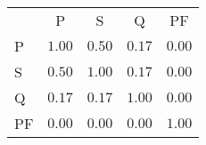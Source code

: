 \begin{tabular}{p{0.5cm}cccc}
 & P & S & Q & PF\\ 
P & 
 $1.00$
 & 
 $0.50$
 & 
 $0.17$
 & 
 $0.00$
\\ 
S & 
 $0.50$
 & 
 $1.00$
 & 
 $0.17$
 & 
 $0.00$
\\ 
Q & 
 $0.17$
 & 
 $0.17$
 & 
 $1.00$
 & 
 $0.00$
\\ 
PF & 
 $0.00$
 & 
 $0.00$
 & 
 $0.00$
 & 
 $1.00$
\\ 
\end{tabular}
